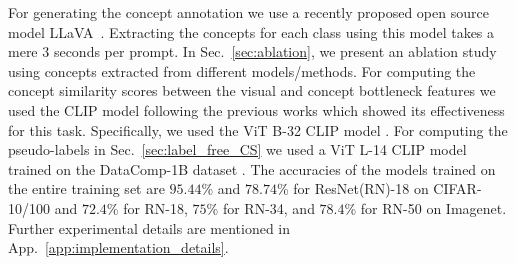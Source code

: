 For generating the concept annotation we use a recently proposed open source model LLaVA~\cite{liu2023llava,liu2023improvedllava}. Extracting the concepts for each class using this model takes a mere 3 seconds per prompt. In Sec.~\ref{sec:ablation}, we present an ablation study using concepts extracted from different models/methods. 
For computing the concept similarity scores between the visual and concept bottleneck features we used the CLIP \cite{radford2021learning} model following the previous works \cite{yun2022vision,yang2023language,yan2023learning} which showed its effectiveness for this task.  Specifically, we used the ViT B-32 CLIP model \cite{radford2021learning}. 
For computing the pseudo-labels in Sec.~\ref{sec:label_free_CS} we used a ViT L-14 CLIP model trained on the DataComp-1B dataset \cite{ilharco_gabriel_2021_5143773}.
The accuracies of the models trained on the entire training set are $95.44$\% and $78.74$\% for ResNet(RN)-18 on CIFAR-10/100 and $72.4$\% for RN-18, $75$\% for RN-34, and $78.4$\% for RN-50 on Imagenet. Further experimental details are mentioned in App.~\ref{app:implementation_details}. %




